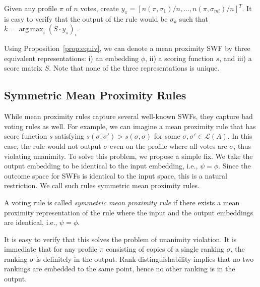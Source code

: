 \documentclass[10pt,letterpaper]{article}
\newcommand{\calL}{{\mathcal{L}}}
\newcommand{\rank}{{\calL(A)}}
\DeclareMathOperator*{\argmax}{arg\,max}
\newenvironment{definition}[1][Definition]{\begin{trivlist}
\item[\hskip \labelsep {\bfseries #1}]}{\end{trivlist}}
\begin{document}
Given any profile $\pi$ of $n$ votes, create $y_{\pi} = [n(\pi,\sigma_1)/n,\ldots,n(\pi,\sigma_{m!})/n]^T$. It is easy to verify that the output of the rule would be $\sigma_k$ such that $k = \argmax_i (S\cdot y_{\pi})_i$. 

Using Proposition~\ref{prop:equiv}, we can denote a mean proximity SWF by three equivalent representations: i) an embedding $\phi$, ii) a scoring function $s$, and iii) a score matrix $S$. Note that none of the three representations is unique. %


\subsection{Symmetric Mean Proximity Rules}

While mean proximity rules capture several well-known SWFs, they capture bad voting rules as well. For example, we can imagine a mean proximity rule that has score function $s$ satisfying $s(\sigma,\sigma') > s(\sigma,\sigma)$ for some $\sigma,\sigma' \in \rank$. In this case, the rule would not output $\sigma$ even on the profile where all votes are $\sigma$, thus violating unanimity. To solve this problem, we propose a simple fix. We take the output embedding to be identical to the input embedding, i.e., $\psi = \phi$. Since the outcome space for SWFs is identical to the input space, this is a natural restriction. We call such rules symmetric mean proximity rules.

\begin{definition}[Symmetric Mean Proximity Rules]
A voting rule is called \emph{symmetric mean proximity rule} if there exists a mean proximity representation of the rule where the input and the output embeddings are identical, i.e., $\psi = \phi$. 
\end{definition} 

It is easy to verify that this solves the problem of unanimity violation. It is immediate that for any profile $\pi$ consisting of copies of a single ranking $\sigma$, the ranking $\sigma$ is definitely in the output. Rank-distinguishability implies that no two rankings are embedded to the same point, hence no other ranking is in the output.

\end{document}
